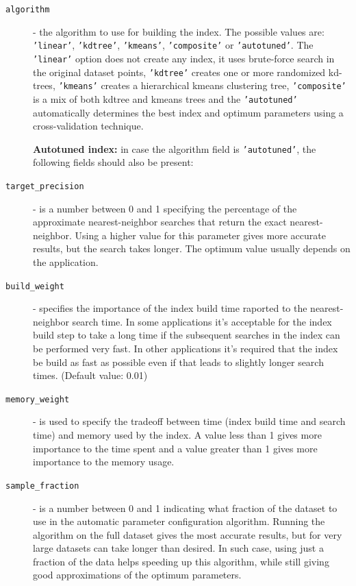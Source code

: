 \documentclass[letter,10pt]{article}
\begin{document}
\begin{description}
\item[\texttt{algorithm}] - the algorithm to use for building the index.
The possible values are: \texttt{'linear'}, \texttt{'kdtree'},
\texttt{'kmeans'}, \texttt{'composite'} or \texttt{'autotuned'}. The \texttt{'linear'} option
does not create any index, it uses brute-force search in the original
dataset points, \texttt{'kdtree'} creates one or more randomized kd-trees,
\texttt{'kmeans'} creates a hierarchical kmeans clustering tree,
\texttt{'composite'} is a mix of both kdtree and kmeans trees and the
\texttt{'autotuned'} automatically determines the best index and optimum
parameters using a cross-validation technique.

\vspace{0.5cm}
\hspace{-1cm} \textbf{Autotuned index:} in case the algorithm field is \texttt{'autotuned'}, the following fields
should also be present:

\item[\texttt{target\_precision}] - is a number between 0 and 1 specifying the
percentage of the approximate nearest-neighbor searches that return the
exact nearest-neighbor. Using a higher value for this parameter gives
more
accurate results, but the search takes longer. The optimum value
usually
depends on the application.

\item[\texttt{build\_weight}] - specifies the importance of the
index build time raported to the nearest-neighbor search time. In some
applications it's acceptable for the index build step to take a long time
if the subsequent searches in the index can be performed very fast. In
other applications it's required that the index be build as fast as
possible even if that leads to slightly longer search times. (Default
value: 0.01)

\item[\texttt{memory\_weight}] - is used to specify the tradeoff between
time (index build time and search time) and memory used by the index. A
value less than 1 gives more importance to the time spent and a value
greater than 1 gives more importance to the memory usage.

\item[\texttt{sample\_fraction}] - is a number between 0 and 1 indicating what fraction
of the dataset to use in the automatic parameter configuration algorithm. Running the 
algorithm on the full dataset gives the most accurate results, but for
very large datasets can take longer than desired. In such case, using just a fraction of the
data helps speeding up this algorithm, while still giving good approximations of the
optimum parameters.


\end{description}
\end{document}

